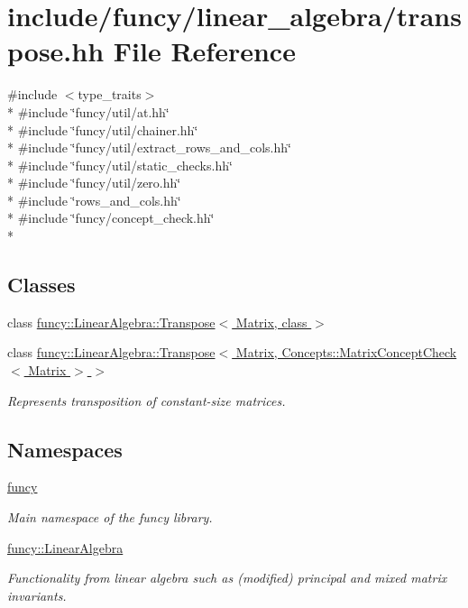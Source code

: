 \hypertarget{transpose_8hh}{\section{include/funcy/linear\-\_\-algebra/transpose.hh File Reference}
\label{transpose_8hh}
}
{\ttfamily \#include $<$type\-\_\-traits$>$}\\*
{\ttfamily \#include \char`\"{}funcy/util/at.\-hh\char`\"{}}\\*
{\ttfamily \#include \char`\"{}funcy/util/chainer.\-hh\char`\"{}}\\*
{\ttfamily \#include \char`\"{}funcy/util/extract\-\_\-rows\-\_\-and\-\_\-cols.\-hh\char`\"{}}\\*
{\ttfamily \#include \char`\"{}funcy/util/static\-\_\-checks.\-hh\char`\"{}}\\*
{\ttfamily \#include \char`\"{}funcy/util/zero.\-hh\char`\"{}}\\*
{\ttfamily \#include \char`\"{}rows\-\_\-and\-\_\-cols.\-hh\char`\"{}}\\*
{\ttfamily \#include \char`\"{}funcy/concept\-\_\-check.\-hh\char`\"{}}\\*
\subsection*{Classes}
\begin{DoxyCompactItemize}
\item 
class \hyperlink{classfuncy_1_1LinearAlgebra_1_1Transpose}{funcy\-::\-Linear\-Algebra\-::\-Transpose$<$ Matrix, class $>$}
\item 
class \hyperlink{classfuncy_1_1LinearAlgebra_1_1Transpose_3_01Matrix_00_01Concepts_1_1MatrixConceptCheck_3_01Matrix_01_4_01_4}{funcy\-::\-Linear\-Algebra\-::\-Transpose$<$ Matrix, Concepts\-::\-Matrix\-Concept\-Check$<$ Matrix $>$ $>$}
\begin{DoxyCompactList}\small\item\em Represents transposition of constant-\/size matrices. \end{DoxyCompactList}\end{DoxyCompactItemize}
\subsection*{Namespaces}
\begin{DoxyCompactItemize}
\item 
\hyperlink{namespacefuncy}{funcy}
\begin{DoxyCompactList}\small\item\em Main namespace of the funcy library. \end{DoxyCompactList}\item 
\hyperlink{namespacefuncy_1_1LinearAlgebra}{funcy\-::\-Linear\-Algebra}
\begin{DoxyCompactList}\small\item\em Functionality from linear algebra such as (modified) principal and mixed matrix invariants. \end{DoxyCompactList}\end{DoxyCompactItemize}
